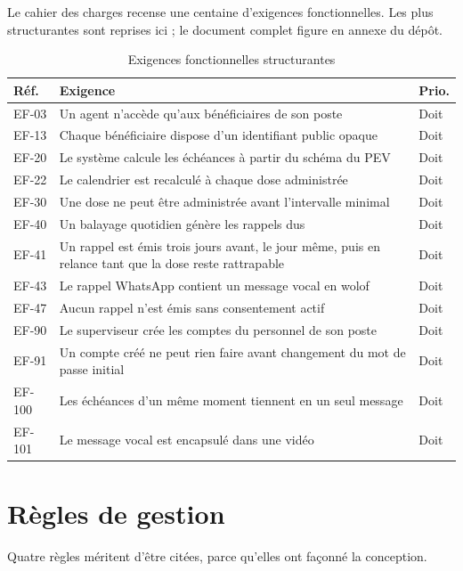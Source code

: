 \documentclass[11pt,a4paper]{report}
\begin{document}
Le cahier des charges recense une centaine d'exigences fonctionnelles. Les
plus structurantes sont reprises ici ; le document complet figure en annexe
du dépôt.

\begin{table}[H]
\centering
\begin{tabularx}{\textwidth}{@{}lXl@{}}
\toprule
\textbf{Réf.} & \textbf{Exigence} & \textbf{Prio.} \\
\midrule
EF-03 & Un agent n'accède qu'aux bénéficiaires de son poste & Doit \\
EF-13 & Chaque bénéficiaire dispose d'un identifiant public opaque & Doit \\
EF-20 & Le système calcule les échéances à partir du schéma du PEV & Doit \\
EF-22 & Le calendrier est recalculé à chaque dose administrée & Doit \\
EF-30 & Une dose ne peut être administrée avant l'intervalle minimal & Doit \\
EF-40 & Un balayage quotidien génère les rappels dus & Doit \\
EF-41 & Un rappel est émis trois jours avant, le jour même, puis en relance
tant que la dose reste rattrapable & Doit \\
EF-43 & Le rappel WhatsApp contient un message vocal en wolof & Doit \\
EF-47 & Aucun rappel n'est émis sans consentement actif & Doit \\
EF-90 & Le superviseur crée les comptes du personnel de son poste & Doit \\
EF-91 & Un compte créé ne peut rien faire avant changement du mot de passe
initial & Doit \\
EF-100 & Les échéances d'un même moment tiennent en un seul message & Doit \\
EF-101 & Le message vocal est encapsulé dans une vidéo & Doit \\
\bottomrule
\end{tabularx}
\caption{Exigences fonctionnelles structurantes}
\end{table}

\section{Règles de gestion}

Quatre règles méritent d'être citées, parce qu'elles ont façonné la
conception.
\end{document}
